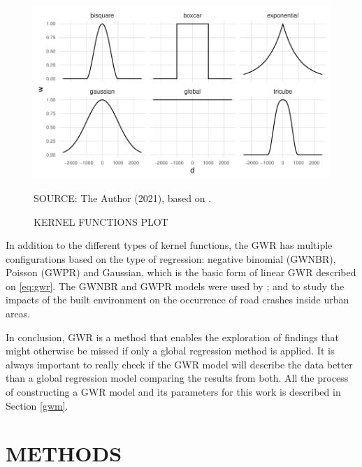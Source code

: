 \begin{figure}[!htbp]
    \centering\footnotesize
    \captionsetup{font=footnotesize}
    \caption{KERNEL FUNCTIONS PLOT}
    \includegraphics{fig/kernel.pdf}
    \label{fig:kernel}
    \par SOURCE: The Author (2021), based on \textcite{Gollini2013}.
\end{figure}

In addition to the different types of kernel functions, the GWR has multiple configurations based on the type of regression: negative binomial (GWNBR), Poisson (GWPR) and Gaussian, which is the basic form of linear GWR described on  \autoref{eq:gwr}. The GWNBR and GWPR models were used by \textcite{Obelheiro2019}; \textcite{Obelheiro2020} and \textcite{Yu2017} to study the impacts of the built environment on the occurrence of road crashes inside urban areas. %

In conclusion, GWR is a method that enables the exploration of findings that might otherwise be missed if only a global regression method is applied. It is always important to really check if the GWR model will describe the data better than a global regression model comparing the results from both. All the process of constructing a GWR model and its parameters for this work is described in Section \ref{gwm}.


\chapter{METHODS}


